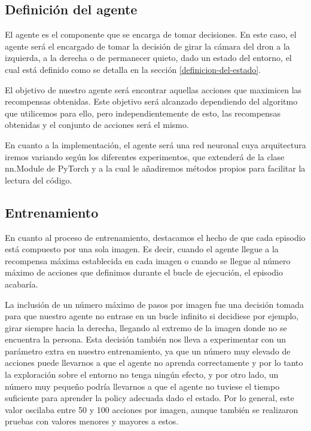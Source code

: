 \subsection{Definición del agente}
\label{definicion-del-agente}

El agente es el componente que se encarga de tomar decisiones. En este caso, el agente será el encargado de tomar la decisión de girar la cámara del dron a la izquierda, a la derecha o de permanecer quieto, dado un estado del entorno, el cual está definido como se detalla en la sección \ref{definicion-del-estado}.
\medskip

El objetivo de nuestro agente será encontrar aquellas acciones que maximicen las recompensas obtenidas. Este objetivo será alcanzado dependiendo del algoritmo que utilicemos para ello, pero independientemente de esto, las recompensas obtenidas y el conjunto de acciones será el mismo.
\medskip

En cuanto a la implementación, el agente será una red neuronal cuya arquitectura iremos variando según los diferentes experimentos, que extenderá de la clase nn.Module de PyTorch y a la cual le añadiremos métodos propios para facilitar la lectura del código.


\subsection{Entrenamiento}
\label{entrenamiento}

En cuanto al proceso de entrenamiento, destacamos el hecho de que cada episodio está compuesto por una sola imagen. Es decir, cuando el agente llegue a la recompensa máxima establecida en cada imagen o cuando se llegue al número máximo de acciones que definimos durante el bucle de ejecución, el episodio acabaría. 
\medskip

La inclusión de un número máximo de pasos por imagen fue una decisión tomada para que nuestro agente no entrase en un bucle infinito si decidiese por ejemplo, girar siempre hacia la derecha, llegando al extremo de la imagen donde no se encuentra la persona. Esta decisión también nos lleva a experimentar con un parámetro extra en nuestro entrenamiento, ya que un número muy elevado de acciones puede llevarnos a que el agente no aprenda correctamente y por lo tanto la exploración sobre el entorno no tenga ningún efecto, y por otro lado, un número muy pequeño podría llevarnos a que el agente no tuviese el tiempo suficiente para aprender la policy adecuada dado el estado. Por lo general, este valor oscilaba entre 50 y 100 acciones por imagen, aunque también se realizaron pruebas con valores menores y mayores a estos.
\medskip

